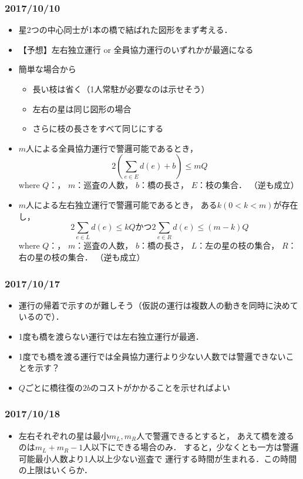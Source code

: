 \subsubsection{2017/10/10}
\begin{itemize}
  \item 星2つの中心同士が1本の橋で結ばれた図形をまず考える．
  \item 【予想】左右独立運行 or 全員協力運行のいずれかが最適になる
  \item 簡単な場合から
  \begin{itemize}
    \item 長い枝は省く（1人常駐が必要なのは示せそう）
    \item 左右の星は同じ図形の場合
    \item さらに枝の長さをすべて同じにする
  \end{itemize}

  \item $m$人による全員協力運行で警邏可能であるとき，
    \[
      2(\sum_{e \in E} d(e) + b) \leq mQ
    \]
    where
      $Q$：{\idletime}，
      $m$：巡査の人数，
      $b$：橋の長さ，
      $E$：枝の集合．
    （逆も成立）

  \item $m$人による左右独立運行で警邏可能であるとき，
    ある$k (0 < k < m)$が存在し，
    \[
      2 \sum_{e \in L} d(e) \leq kQ
      \text{かつ}
      2 \sum_{e \in R} d(e) \leq (m - k)Q
    \]
    where
      $Q$：{\idletime}，
      $m$：巡査の人数，
      $b$：橋の長さ，
      $L$：左の星の枝の集合，
      $R$：右の星の枝の集合．
    （逆も成立）
\end{itemize}



\subsubsection{2017/10/17}
\begin{itemize}
  \item 運行の帰着で示すのが難しそう（仮説の運行は複数人の動きを同時に決めているので）．
  \item 1度も橋を渡らない運行では左右独立運行が最適．
  \item 1度でも橋を渡る運行では全員協力運行より少ない人数では警邏できないことを示す？
  \item {\idletime}$Q$ごとに橋往復の$2b$のコストがかかることを示せればよい
\end{itemize}


\subsubsection{2017/10/18}
\begin{itemize}
  \item 左右それぞれの星は最小$m_L, m_R$人で警邏できるとすると，
    あえて橋を渡るのは$m_L + m_R - 1$人以下にできる場合のみ．
    すると，少なくとも一方は警邏可能最小人数より1人以上少ない巡査で
    運行する時間が生まれる．この時間の上限はいくらか．

\end{itemize}

